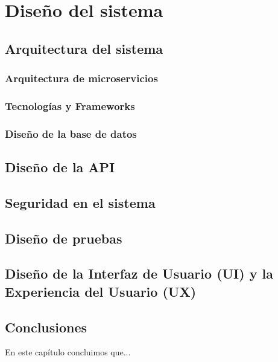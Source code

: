 \chapter{Diseño del sistema}\label{cap:disenio}

\section{Arquitectura del sistema}

\subsection{Arquitectura de microservicios}

\subsection{Tecnologías y Frameworks}

\subsection{Diseño de la base de datos}

\section{Diseño de la API}

\section{Seguridad en el sistema}

\section{Diseño de pruebas}

\section{Diseño de la Interfaz de Usuario (UI) y la Experiencia del Usuario (UX)}

\section{Conclusiones}
En este capítulo concluimos que...